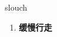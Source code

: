 
\begin{frame}
{\huge slouch}
\begin{center}
\begin{enumerate}\Large
  \item \textbf{缓慢行走}
\end{enumerate}
\end{center}
\end{frame}
